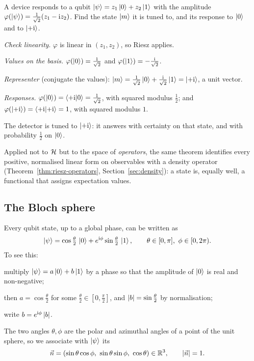 \begin{example}\label{ex:detector}
  A device responds to a qubit $\left|\psi\right\rangle=z_1\left|0\right\rangle+z_2\left|1\right\rangle$ with the amplitude $\varphi(\left|\psi\right\rangle)=\frac1{\sqrt2}(z_1-\mathrm{i} z_2)$. Find the state $\left|m\right\rangle$ it is tuned to, and its response to $\left|0\right\rangle$ and to $\left|+\mathrm{i}\right\rangle$.
\end{example}
\begin{solution}
  \begin{steps}
    \item \emph{Check linearity.} $\varphi$ is linear in $(z_1,z_2)$, so Riesz applies.
    \item \emph{Values on the basis.} $\varphi(\left|0\right\rangle)=\tfrac1{\sqrt2}$ and $\varphi(\left|1\right\rangle)=-\tfrac{\mathrm{i}}{\sqrt2}$.
    \item \emph{Representer} (conjugate the values): $\left|m\right\rangle=\tfrac1{\sqrt2}\left|0\right\rangle+\tfrac{\mathrm{i}}{\sqrt2}\left|1\right\rangle=\left|+\mathrm{i}\right\rangle$, a unit vector.
    \item \emph{Responses.} $\varphi(\left|0\right\rangle)=\left\langle+\mathrm{i}\middle|0\right\rangle=\tfrac1{\sqrt2}$, with squared modulus $\tfrac12$; and $\varphi(\left|+\mathrm{i}\right\rangle)=\left\langle+\mathrm{i}\middle|+\mathrm{i}\right\rangle=1$, with squared modulus $1$.
  \end{steps}
  The detector is tuned to $\left|+\mathrm{i}\right\rangle$: it answers with certainty on that state, and with probability $\tfrac12$ on $\left|0\right\rangle$.
\end{solution}

\begin{lookahead}
  Applied not to $\mathcal{H}$ but to the space of \emph{operators}, the same theorem identifies every positive, normalised linear form on observables with a density operator (Theorem~\ref{thm:riesz-operators}, Section~\ref{sec:density}): a state is, equally well, a functional that assigns expectation values.
\end{lookahead}

\subsection{The Bloch sphere}

Every qubit state, up to a global phase, can be written as
\begin{equation}\label{eq:bloch-param}
  \left|\psi\right\rangle=\cos\tfrac\theta2\,\left|0\right\rangle+e^{\mathrm{i}\phi}\sin\tfrac\theta2\,\left|1\right\rangle,\qquad \theta\in[0,\pi],\ \phi\in[0,2\pi).
\end{equation}
To see this:
\begin{steps}
  \item multiply $\left|\psi\right\rangle=a\left|0\right\rangle+b\left|1\right\rangle$ by a phase so that the amplitude of $\left|0\right\rangle$ is real and non-negative;
  \item then $a=\cos\frac\theta2$ for some $\frac\theta2\in[0,\frac\pi2]$, and $\left|b\right|=\sin\frac\theta2$ by normalisation;
  \item write $b=e^{\mathrm{i}\phi}\left|b\right|$.
\end{steps}
The two angles $\theta,\phi$ are the polar and azimuthal angles of a point of the unit sphere, so we associate with $\left|\psi\right\rangle$ its 
\[
  \vec n=(\sin\theta\cos\phi,\ \sin\theta\sin\phi,\ \cos\theta)\in\R^3,\qquad \abs{\vec n}=1 .
\]

